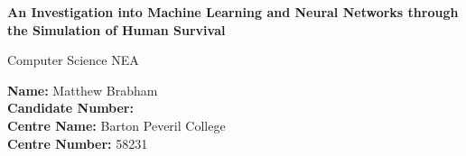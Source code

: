 \documentclass{article}
\begin{document}
\begin{titlepage}
    \begin{center}
        \vspace{1cm}
        \Huge
        
        \textbf{An Investigation into Machine Learning and Neural Networks through the Simulation of Human Survival}
        
        \vspace{1cm}
        \Large
        Computer Science NEA
        
        \vfill
        
        \large
        \textbf{Name:} Matthew Brabham\\
        \textbf{Candidate Number:} \\
        
        \textbf{Centre Name:} Barton Peveril College\\
        \textbf{Centre Number:} 58231\\
        \pagebreak
    \end{center}
\end{titlepage}
\end{document}
